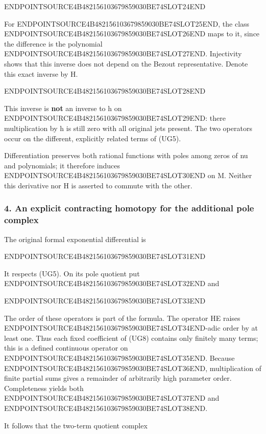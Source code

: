 ENDPOINTSOURCE4B482156103679859030BE74SLOT24END

For ENDPOINTSOURCE4B482156103679859030BE74SLOT25END, the class ENDPOINTSOURCE4B482156103679859030BE74SLOT26END maps to it, since the difference is the polynomial ENDPOINTSOURCE4B482156103679859030BE74SLOT27END. Injectivity shows that this inverse does not depend on the Bezout representative. Denote this exact inverse by H.

ENDPOINTSOURCE4B482156103679859030BE74SLOT28END

This inverse is \textbf{not} an inverse to h on ENDPOINTSOURCE4B482156103679859030BE74SLOT29END: there multiplication by h is still zero with all original jets present. The two operators occur on the different, explicitly related terms of (UG5).

Differentiation preserves both rational functions with poles among zeros of nu and polynomials; it therefore induces ENDPOINTSOURCE4B482156103679859030BE74SLOT30END on M. Neither this derivative nor H is asserted to commute with the other.

\subsubsection{4. An explicit contracting homotopy for the additional pole complex}\label{endpoint-f1_unit_gauge--an-explicit-contracting-homotopy-for-the-additional-pole-complex}

The original formal exponential differential is

ENDPOINTSOURCE4B482156103679859030BE74SLOT31END

It respects (UG5). On its pole quotient put ENDPOINTSOURCE4B482156103679859030BE74SLOT32END and

ENDPOINTSOURCE4B482156103679859030BE74SLOT33END

The order of these operators is part of the formula. The operator HE raises ENDPOINTSOURCE4B482156103679859030BE74SLOT34END-adic order by at least one. Thus each fixed coefficient of (UG8) contains only finitely many terms; this is a defined continuous operator on ENDPOINTSOURCE4B482156103679859030BE74SLOT35END. Because ENDPOINTSOURCE4B482156103679859030BE74SLOT36END, multiplication of finite partial sums gives a remainder of arbitrarily high parameter order. Completeness yields both ENDPOINTSOURCE4B482156103679859030BE74SLOT37END and ENDPOINTSOURCE4B482156103679859030BE74SLOT38END.

It follows that the two-term quotient complex

